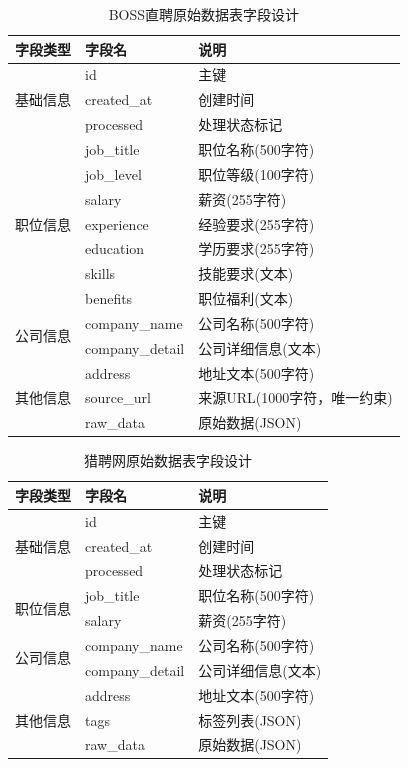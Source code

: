 \begin{table}[htbp]
  \centering
  \caption{BOSS直聘原始数据表字段设计}
  \label{tab:raw_boss_data_fields}
  \begin{tabular}{@{}lll@{}}
    \toprule
    \textbf{字段类型} & \textbf{字段名} & \textbf{说明} \\
    \midrule
    \multirow{3}{*}{基础信息}
    & id & 主键 \\
    & created\_at & 创建时间 \\
    & processed & 处理状态标记 \\
    \midrule
    \multirow{7}{*}{职位信息}
    & job\_title & 职位名称(500字符) \\
    & job\_level & 职位等级(100字符) \\
    & salary & 薪资(255字符) \\
    & experience & 经验要求(255字符) \\
    & education & 学历要求(255字符) \\
    & skills & 技能要求(文本) \\
    & benefits & 职位福利(文本) \\
    \midrule
    \multirow{2}{*}{公司信息}
    & company\_name & 公司名称(500字符) \\
    & company\_detail & 公司详细信息(文本) \\
    \midrule
    \multirow{3}{*}{其他信息}
    & address & 地址文本(500字符) \\
    & source\_url & 来源URL(1000字符，唯一约束) \\
    & raw\_data & 原始数据(JSON) \\
    \bottomrule
  \end{tabular}
\end{table}

\begin{table}[htbp]
  \centering
  \caption{猎聘网原始数据表字段设计}
  \label{tab:raw_liepin_data_fields}
  \begin{tabular}{@{}lll@{}}
    \toprule
    \textbf{字段类型} & \textbf{字段名} & \textbf{说明} \\
    \midrule
    \multirow{3}{*}{基础信息}
    & id & 主键 \\
    & created\_at & 创建时间 \\
    & processed & 处理状态标记 \\
    \midrule
    \multirow{2}{*}{职位信息}
    & job\_title & 职位名称(500字符) \\
    & salary & 薪资(255字符) \\
    \midrule
    \multirow{2}{*}{公司信息}
    & company\_name & 公司名称(500字符) \\
    & company\_detail & 公司详细信息(文本) \\
    \midrule
    \multirow{3}{*}{其他信息}
    & address & 地址文本(500字符) \\
    & tags & 标签列表(JSON) \\
    & raw\_data & 原始数据(JSON) \\
    \bottomrule
  \end{tabular}
\end{table}

